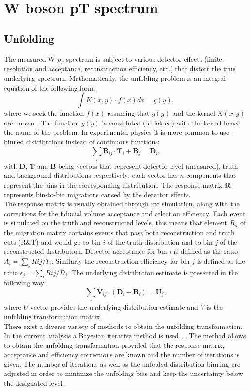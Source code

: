 \chapter{W boson pT spectrum}

\section{Unfolding}
The measured W $p_T$ spectrum is subject to various detector effects (finite resolution and acceptance, reconstruction efficiency, etc.) that distort the true underlying spectrum. Mathematically, the unfolding problem is an integral equation of the following form:
\begin{equation}
	\int K(x,y)\cdot f(x)dx = g(y),
\end{equation}
where we seek the function $f(x)$ assuming that $g(y)$ and the kernel $K(x,y)$ are known \cite{Schmitt:2016orm}. The function $g(y)$ is convoluted (or folded) with the kernel hence the name of the problem. In experimental physics it is more common to use binned distributions instead of continuous functions: 
\begin{equation}
\sum_{i} \textbf{R}_{ij}\cdot \textbf{T}_i + \textbf{B}_j = \textbf{D}_j,
\end{equation}
with $\textbf{D}$, $\textbf{T}$ and $\textbf{B}$ being vectors that represent detector-level (measured), truth and background distributions respectively; each vector has $n$ components that represent the bins in the corresponding distribution. The response matrix $\textbf{R}$ represents bin-to-bin migrations caused by the detector effects. \\
The response matrix is usually obtained through \gls{mc} simulation, along with the corrections for the fiducial volume acceptance and selection efficiency. Each event is simulated on the truth and reconstructed levels, this means that element $R_{il}$ of the migration matrix contains events that pass both reconstruction and truth cuts (R\&T) and would go to bin $i$ of the truth distribution and to bin $j$ of the reconstructed distribution. Detector acceptance for bin $i$ is defined as the ratio $A_i=\sum_j R{ij}/T_i$. Similarly the reconstruction efficiency for bin $j$ is defined as the ratio $\epsilon_j=\sum_i R{ij}/D_j$.
The underlying distribution estimate is presented in the following way:
\begin{equation}
\sum_{i} \textbf{V}_{ij}\cdot (\textbf{D}_i - \textbf{B}_i) = \textbf{U}_j,
\end{equation}
 where $U$ vector provides the underlying distribution estimate and $V$ is the unfolding transformation matrix.\\
 There exist a diverse variety of methods to obtain the unfolding transformation. In the current analysis a Bayesian iterative method is used \cite{unfolding1}, \cite{unfolding2}. The method allows to obtain the unfolding transformation provided that the response matrix, acceptance and efficiency corrections are known and the number of iterations is given. The number of iterations as well as the unfolded distribution binning are adjusted in order to minimize the unfolding bias and keep the uncertainty below the designated level. 

